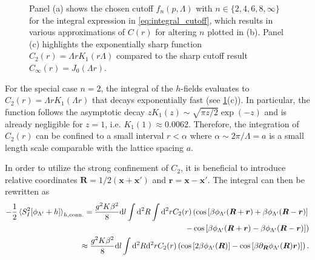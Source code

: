 \begin{figure}
    \caption{Panel (a) shows the chosen cutoff $f_n(p,\Lambda)$ with $n\in\{2,4,6,8,\infty\}$ for the integral expression in \cref{eq:integral_cutoff}, which results in various approximations of $C(r)$ for altering $n$ plotted in (b). Panel (c) highlights the exponentially sharp function $C_2(r)=\Lambda rK_1(r\Lambda)$ compared to the sharp cutoff result $C_\infty(r)=J_0(\Lambda r)$.}
    \label{fig:rg_cutoff}
\end{figure}
For the special case $n=2$, the integral of the $h$-fields evaluates to $C_2(r)=\Lambda r K_1(\Lambda r)$ that decays exponentially fast (see \cref{fig:rg_cutoff}(c)).
In particular, the function follows the asymptotic decay $z K_1(z) \sim \sqrt{\pi z/2}\exp(-z)$ and is already negligible for $z=1$, i.e. $K_1(1)\approx0.0062$.
Therefore, the integration of $C_2(r)$ can be confined to a small interval $r<\alpha$ where $\alpha\sim2\pi/\Lambda=a$ is a small length scale comparable with the lattice spacing $a$.

In order to utilize the strong confinement of $C_2$, it is beneficial to introduce relative coordinates ${\bm R} = 1/2({\bm x}+{\bm x'})$ and ${\bm r} = {\bm x}-{\bm x'}$.
The integral can then be rewritten as
{\small
\begin{align}
    -\frac12\braket{S^2_I[\phi_{\Lambda'}+h]}_{h,{\rm conn.}}
    =
    \frac{g^2K\beta^2}8\mathrm d l\int\mathrm d^2R\int\mathrm d^2r
    C_2(r)
    \left(
        \cos\left[ \beta\phi_{\Lambda'}({\bm R}+{\bm r})+\beta\phi_{\Lambda'}({\bm R}-{\bm r}) \right]
        \right.
        \label{eq:rg_int_1}\\
        \left.-
        \cos\left[ \beta\phi_{\Lambda'}({\bm R}+{\bm r})-\beta\phi_{\Lambda'}({\bm R}-{\bm r}) \right]
    \right)
    \label{eq:rg_int_2}
    \\
    \approx
    \frac{g^2K\beta^2}{8}\mathrm d l\int\mathrm d^2R\mathrm d^2rC_2(r)
    \left(
        \cos\left[ 2\beta\phi_{\Lambda'}({\bm R}) \right]
        -
        \cos\left[ \beta\partial_{\bm R}\phi_{\Lambda'}({\bm R}){\bm r}) \right]
    \right).
    \label{eq:rg_int_rel_coords}
\end{align}
}%

